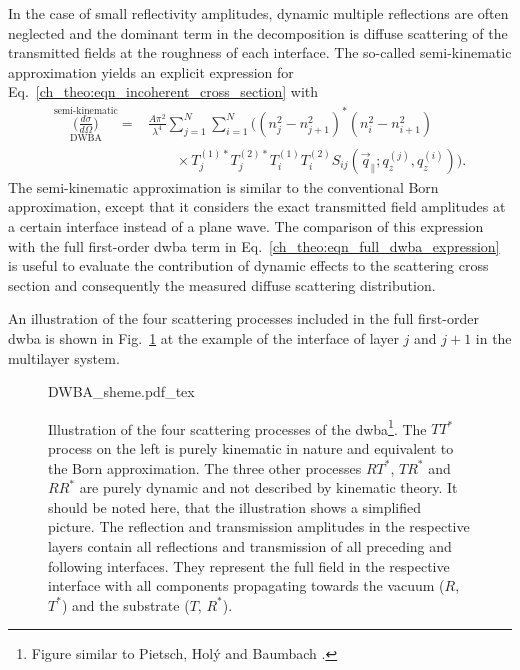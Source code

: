 In the case of small reflectivity amplitudes, dynamic multiple reflections are often neglected and the dominant term in the decomposition is diffuse scattering of the transmitted fields at the roughness of each interface. The so-called semi-kinematic approximation \cite{sinha_x-ray_1988} yields an explicit expression for Eq.~\eqref{ch_theo:eqn_incoherent_cross_section} with
\begin{align}
                \overset{\text{semi-kinematic}}{\underset{\text{DWBA}}{\Big(\frac{d \sigma}{d \Omega}\Big)}} = &\frac{A \pi^2}{\lambda^4}\sum \limits_{j=1}^{N}\sum \limits_{i=1}^{N} \Big((n_j^2 - n_{j+1}^2)^* (n_i^2 - n_{i+1}^2) \nonumber \\ &\qquad\times T^{(1)*}_j T^{(2)*}_j T^{(1)}_i T^{(2)}_i S_{ij}(\vec{q}_\parallel; q_z^{(j)}, q_z^{(i)})\Big)\text{.} \label{ch_theo:eqn_semi_kinematic_dwba_expression} 
\end{align}
The semi-kinematic approximation is similar to the conventional Born approximation, except that it considers the exact transmitted field amplitudes at a certain interface instead of a plane wave. The comparison of this expression with the full first-order \gls{dwba} term in Eq.~\eqref{ch_theo:eqn_full_dwba_expression} is useful to evaluate the contribution of dynamic effects to the scattering cross section and consequently the measured diffuse scattering distribution.

An illustration of the four scattering processes included in the full first-order \gls{dwba} is shown in Fig.~\ref{ch_theo:fig_dwba_scheme} at the example of the interface of layer $j$ and $j+1$ in the multilayer system.
\begin{figure}[htb]
    \def\svgwidth{\textwidth}
    {DWBA_sheme.pdf_tex}
    \caption[Illustration of the four scattering processes of the DWBA.]{Illustration of the four scattering processes of the \gls{dwba}\footnote{Figure similar to Pietsch, Hol\'{y} and Baumbach \cite{pietsch_high-resolution_2004}.}. The $T T^*$ process on the left is purely kinematic in nature and equivalent to the Born approximation. The three other processes $RT^*$, $TR^*$ and $RR^*$ are purely dynamic and not described by kinematic theory. It should be noted here, that the illustration shows a simplified picture. The reflection and transmission amplitudes in the respective layers contain all reflections and transmission of all preceding and following interfaces. They represent the full field in the respective interface with all components propagating towards the vacuum ($R$, $T^*$) and the substrate ($T$, $R^*$).}
    \label{ch_theo:fig_dwba_scheme}
\end{figure}


